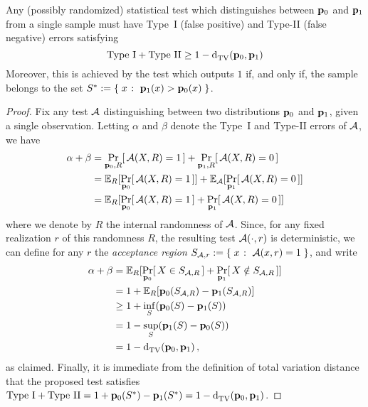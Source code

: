 \begin{lemma}
  Any (possibly randomized) statistical test which distinguishes between $\mathbf{p}_0$ and $\mathbf{p}_1$ from a single sample must have Type~I (false positive) and Type-II (false negative) errors satisfying
  \[
      \text{Type~I} + \text{Type~II} \geq 1- \totalvardist{\p_0}{\p_1}
  \]
  Moreover, this is achieved by the test which outputs $1$ if, and only if, the sample belongs to the set $S^\ast \eqdef \setOfSuchThat{x}{\p_1(x) > \p_0(x)}$.
\end{lemma}
\begin{proof}
Fix any test $\mathcal{A}$ distinguishing between two distributions $\mathbf{p}_0$ and $\mathbf{p}_1$, given a single observation. Letting $\alpha$ and $\beta$ denote the Type~I and Type-II errors of $\mathcal{A}$, we have
\begin{align*}
  \alpha+\beta 
  &= \probaDistrOf{\p_0,R}{\Algo(X,R)=1} + \probaDistrOf{\p_1,R}{\Algo(X,R)=0} \\
  &= \shortexpect_{R}[ \probaDistrOf{\p_0}{\Algo(X,R)=1} ] + \shortexpect_{\Algo}[ \probaDistrOf{\p_1}{\Algo(X,R)=0} ] \\
  &= \shortexpect_{R}[ \probaDistrOf{\p_0}{\Algo(X,R)=1} + \probaDistrOf{\p_1}{\Algo(X,R)=0} ]
\end{align*}
where we denote by $R$ the internal randomness of $\mathcal{A}$. Since, for any fixed realization $r$ of this randomness $R$, the resulting test $\mathcal{A}(\cdot,r)$ is deterministic, we can define for any $r$ the \emph{acceptance region} $S_{\Algo,r} \eqdef \setOfSuchThat{x}{\Algo(x,r)=1}$, and write
\begin{align*}
  \alpha+\beta 
  &= \shortexpect_{R}[ \probaDistrOf{\p_0}{X \in S_{\Algo,R}} + \probaDistrOf{\p_1}{X \notin S_{\Algo,R}} ] \\
  &= 1+\shortexpect_{R}[ \p_0(S_{\Algo,R}) - \p_1(S_{\Algo,R}) ] \\
  &\geq 1 + \inf_{S}(\p_0(S) - \p_1(S)) \\
  &= 1 - \sup_{S}(\p_1(S) - \p_0(S)) \\
  &= 1- \totalvardist{\p_0}{\p_1}\,,
\end{align*}
as claimed. Finally, it is immediate from the definition of total variation distance that the proposed test satisfies $\text{Type~I} + \text{Type~II} = 1 + \p_0(S^\ast) - \p_1(S^\ast) = 1- \totalvardist{\p_0}{\p_1}$.
\end{proof}
\tbc
